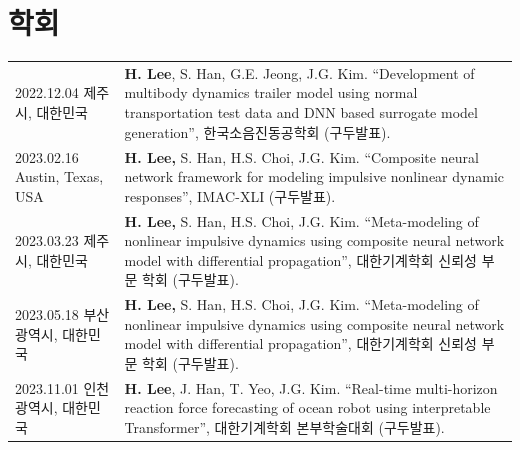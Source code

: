 \documentclass[a4paper,10pt]{extarticle}
\begin{document}
\section*{학회}
\noindent
{}
\vspace*{-.5cm}
\begin{longtable}{LR}
    {2022.12.04 \linebreak 제주시, 대한민국}        & \textbf{H. Lee}, S. Han, G.E. Jeong, J.G. Kim. “Development of multibody dynamics trailer model using normal transportation test data and DNN based surrogate model generation”, 한국소음진동공학회 (구두발표). \\
    {2023.02.16 \linebreak  Austin, Texas, USA} & \textbf{H. Lee,} S. Han, H.S. Choi, J.G. Kim. “Composite neural network framework for modeling impulsive nonlinear dynamic responses”, IMAC-XLI (구두발표).                                            \\
    {2023.03.23 \linebreak 제주시, 대한민국}        & \textbf{H. Lee,} S. Han, H.S. Choi, J.G. Kim. “Meta-modeling of nonlinear impulsive dynamics using composite neural network model with differential propagation”, 대한기계학회 신뢰성 부문 학회 (구두발표).         \\
    {2023.05.18 \linebreak 부산광역시, 대한민국}      & \textbf{H. Lee,} S. Han, H.S. Choi, J.G. Kim. “Meta-modeling of nonlinear impulsive dynamics using composite neural network model with differential propagation”, 대한기계학회 신뢰성 부문 학회 (구두발표).         \\
    {2023.11.01 \linebreak 인천광역시, 대한민국}      & \textbf{H. Lee}, J. Han, T. Yeo, J.G. Kim. “Real-time multi-horizon reaction force forecasting of ocean robot using interpretable Transformer”,  대한기계학회 본부학술대회 (구두발표).                             \\
\end{longtable}


\end{document}
